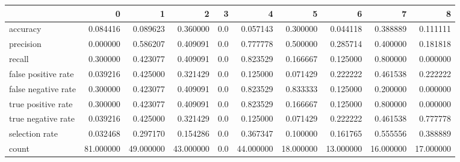 \begin{tabular}{lrrrrrrrrr}
\toprule
{} &          0 &          1 &          2 &    3 &          4 &          5 &          6 &          7 &          8 \\
\midrule
accuracy            &   0.084416 &   0.089623 &   0.360000 &  0.0 &   0.057143 &   0.300000 &   0.044118 &   0.388889 &   0.111111 \\
precision           &   0.000000 &   0.586207 &   0.409091 &  0.0 &   0.777778 &   0.500000 &   0.285714 &   0.400000 &   0.181818 \\
recall              &   0.300000 &   0.423077 &   0.409091 &  0.0 &   0.823529 &   0.166667 &   0.125000 &   0.800000 &   0.000000 \\
false positive rate &   0.039216 &   0.425000 &   0.321429 &  0.0 &   0.125000 &   0.071429 &   0.222222 &   0.461538 &   0.222222 \\
false negative rate &   0.300000 &   0.423077 &   0.409091 &  0.0 &   0.823529 &   0.833333 &   0.125000 &   0.200000 &   0.000000 \\
true positive rate  &   0.300000 &   0.423077 &   0.409091 &  0.0 &   0.823529 &   0.166667 &   0.125000 &   0.800000 &   0.000000 \\
true negative rate  &   0.039216 &   0.425000 &   0.321429 &  0.0 &   0.125000 &   0.071429 &   0.222222 &   0.461538 &   0.777778 \\
selection rate      &   0.032468 &   0.297170 &   0.154286 &  0.0 &   0.367347 &   0.100000 &   0.161765 &   0.555556 &   0.388889 \\
count               &  81.000000 &  49.000000 &  43.000000 &  0.0 &  44.000000 &  18.000000 &  13.000000 &  16.000000 &  17.000000 \\
\bottomrule
\end{tabular}
